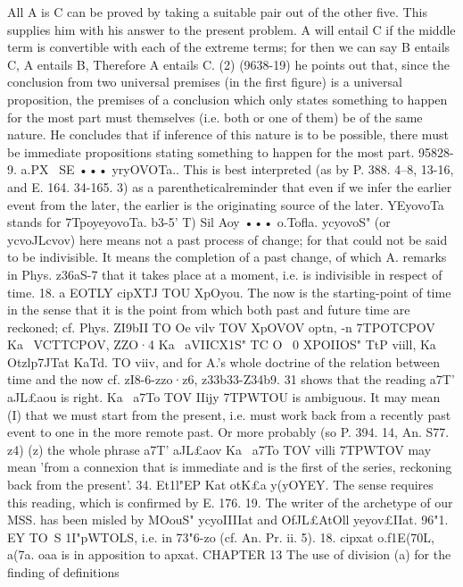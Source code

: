 {{{{{{{{{{{{{{{{{{{{{{{{{{{{{{{{{{{{{{{{{{{{{{{{{{{{{{{{{{{{{{All A is C can be proved by taking a suitable pair out of the other
five. This supplies him with his answer to the present problem.
A will entail C if the middle term is convertible with each of the
extreme terms; for then we can say B entails C, A entails B,
Therefore A entails C. (2) (9638-19) he points out that, since the
conclusion from two universal premises (in the first figure) is
a universal proposition, the premises of a conclusion which only
states something to happen for the most part must themselves
(i.e. both or one of them) be of the same nature. He concludes
that if inference of this nature is to be possible, there must be
immediate propositions stating something to happen for the most
part.
95828-9. a.PX~ SE ••• yryOVOTa.. This is best interpreted (as
by P. 388. 4--8, 13-16, and E. 164. 34-165. 3) as a parentheticalreminder that even if we infer the earlier event from the later,
the earlier is the originating source of the later. YEyovoTa stands
for 7TpoyeyovoTa.
b3-5' T) Sil Aoy ••• o.Tofla. ycyovoS" (or ycvoJLcvov) here means
not a past process of change; for that could not be said to be
indivisible. It means the completion of a past change, of which
A. remarks in Phys. z36aS-7 that it takes place at a moment, i.e.
is indivisible in respect of time.
18. a EOTLY cipXTJ TOU XpOyou. The now is the starting-point
of time in the sense that it is the point from which both past and
future time are reckoned; cf. Phys. ZI9bII TO Oe vilv TOV XpOVOV
opt{n, -n 7TPOTCPOV Ka~ VCTTCPOV, ZZO·4 Ka~ aVIICX1}S" TC O~ 0 XPOIIOS" TtP
viill, Ka~ Otzlp7JTat KaTd. TO viiv, and for A.'s whole doctrine of the
relation between time and the now cf. zI8-6-zzo·z6, z33b33-Z34b9.
31 shows that the reading a7T' aJL£aou is right. Ka~ a7To TOV IIijy
7TPWTOU is ambiguous. It may mean (I) that we must start from
the present, i.e. must work back from a recently past event to
one in the more remote past. Or more probably (so P. 394. 14,
An. S77. z4) (z) the whole phrase a7T' aJL£aov Ka~ a7To TOV villi 7TPWTOV
may mean 'from a connexion that is immediate and is the first
of the series, reckoning back from the present'.
34. Et1l"EP Kat otK£a y(yOYEY. The sense requires this reading,
which is confirmed by E. 176. 19. The writer of the archetype of
our MSS. has been misled by MOouS" ycyoII{IIat and OfJL£AtOll
yeyov£IIat.
96"1. EY TO~S 1I"pWTOLS, i.e. in 73"6-zo (cf. An. Pr. ii. 5).
18. cipxat o.f1E(70L, a(7a. oaa is in apposition to apxat.
CHAPTER 13
The use of division (a) for the finding of definitions
}}}}}}}}}}}}}}}}}}}}}}}}}}}}}}}}}}}}}}}}}}}}}}}}}}}}}}}}}}}}}}}
